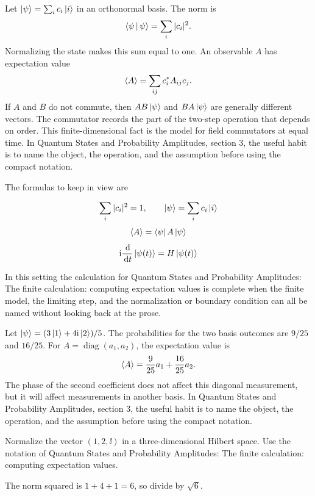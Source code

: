 Let \(\left|\psi\right\rangle=\sum_i c_i\left|i\right\rangle\) in an orthonormal basis.  The norm is
\[
  \left\langle \psi\,\middle|\,\psi\right\rangle=\sum_i |c_i|^2.
\]
Normalizing the state makes this sum equal to one.  An observable \(A\) has expectation value
\[
  \left\langle A\right\rangle=\sum_{ij}c_i^*A_{ij}c_j.
\]
If \(A\) and \(B\) do not commute, then \(AB\left|\psi\right\rangle\) and \(BA\left|\psi\right\rangle\) are generally different vectors.  The commutator records the part of the two-step operation that depends on order.  This finite-dimensional fact is the model for field commutators at equal time.  In Quantum States and Probability Amplitudes, section 3, the useful habit is to name the object, the operation, and the assumption before using the compact notation.

The formulas to keep in view are

\[
  \sum_i |c_i|^2=1,\qquad \left|\psi\right\rangle=\sum_i c_i\left|i\right\rangle
\]
\[
  \left\langle A\right\rangle=\left\langle \psi\right|A\left|\psi\right\rangle
\]
\[
  \mathrm i\frac{\,\mathrm d}{\,\mathrm d t}\left|\psi(t)\right\rangle=H\left|\psi(t)\right\rangle
\]

In this setting the calculation for Quantum States and Probability Amplitudes: The finite calculation: computing expectation values is complete when the finite model, the limiting step, and the normalization or boundary condition can all be named without looking back at the prose.




\begin{example}
Let \(\left|\psi\right\rangle=(3\left|1\right\rangle+4\mathrm i\left|2\right\rangle)/5\).  The probabilities for the two basis outcomes are \(9/25\) and \(16/25\).  For \(A=\operatorname{diag}(a_1,a_2)\), the expectation value is
\[
  \left\langle A\right\rangle=\frac{9}{25}a_1+\frac{16}{25}a_2.
\]
The phase of the second coefficient does not affect this diagonal measurement, but it will affect measurements in another basis.  In Quantum States and Probability Amplitudes, section 3, the useful habit is to name the object, the operation, and the assumption before using the compact notation.
\end{example}



\begin{exercise}
Normalize the vector \((1,2,\ii)\) in a three-dimensional Hilbert space.  Use the notation of Quantum States and Probability Amplitudes: The finite calculation: computing expectation values.
\begin{answer}
The norm squared is \(1+4+1=6\), so divide by \(\sqrt6\).
\end{answer}
\end{exercise}

